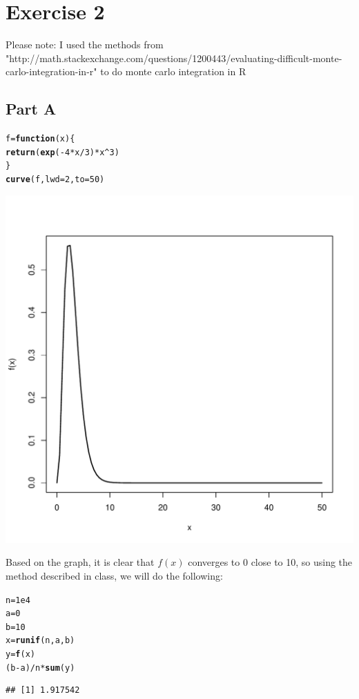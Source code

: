 \documentclass{article}\usepackage[]{graphicx}\usepackage[]{color}
\makeatletter
\newcommand{\hlnum}[1]{\textcolor[rgb]{0.686,0.059,0.569}{#1}}%
\newcommand{\hlopt}[1]{\textcolor[rgb]{0,0,0}{#1}}%
\newcommand{\hlstd}[1]{\textcolor[rgb]{0.345,0.345,0.345}{#1}}%
\newcommand{\hlkwa}[1]{\textcolor[rgb]{0.161,0.373,0.58}{\textbf{#1}}}%
\newcommand{\hlkwb}[1]{\textcolor[rgb]{0.69,0.353,0.396}{#1}}%
\newcommand{\hlkwc}[1]{\textcolor[rgb]{0.333,0.667,0.333}{#1}}%
\newcommand{\hlkwd}[1]{\textcolor[rgb]{0.737,0.353,0.396}{\textbf{#1}}}%
\newenvironment{kframe}{%
 \def\at@end@of@kframe{}%
 \ifinner\ifhmode%
  \def\at@end@of@kframe{\end{minipage}}%
  \begin{minipage}{\columnwidth}%
 \fi\fi%
 \def\FrameCommand##1{\hskip\@totalleftmargin \hskip-\fboxsep
 \colorbox{shadecolor}{##1}\hskip-\fboxsep
     \hskip-\linewidth \hskip-\@totalleftmargin \hskip\columnwidth}%
 \MakeFramed {\advance\hsize-\width
   \@totalleftmargin\z@ \linewidth\hsize
   \@setminipage}}%
 {\par\unskip\endMakeFramed%
 \at@end@of@kframe}
\newenvironment{knitrout}{}{} %
\makeatother
\begin{document}
\section*{Exercise 2}
Please note: I used the methods from "http://math.stackexchange.com/questions/1200443/evaluating-difficult-monte-carlo-integration-in-r" to do monte carlo integration in R
\subsection*{Part A}
\begin{knitrout}
\color{fgcolor}\begin{kframe}
\begin{alltt}
\hlstd{f} \hlkwb{=} \hlkwa{function}\hlstd{(}\hlkwc{x}\hlstd{)\{}
  \hlkwd{return}\hlstd{(}\hlkwd{exp}\hlstd{(}\hlopt{-}\hlnum{4}\hlopt{*}\hlstd{x}\hlopt{/}\hlnum{3}\hlstd{)}\hlopt{*}\hlstd{x}\hlopt{^}\hlnum{3}\hlstd{)}
\hlstd{\}}
\hlkwd{curve}\hlstd{(f,} \hlkwc{lwd}\hlstd{=}\hlnum{2}\hlstd{,}\hlkwc{to} \hlstd{=} \hlnum{50}\hlstd{)}
\end{alltt}
\end{kframe}
\includegraphics[width=0.60\linewidth]{figure/unnamed-chunk-3-1} 

\end{knitrout}
Based on the graph, it is clear that $f(x)$ converges to 0 close to 10, so using the method described in class, we will do the following:
\begin{knitrout}
\color{fgcolor}\begin{kframe}
\begin{alltt}
\hlstd{n} \hlkwb{=} \hlnum{1e4}
\hlstd{a} \hlkwb{=} \hlnum{0}
\hlstd{b} \hlkwb{=} \hlnum{10}
\hlstd{x} \hlkwb{=} \hlkwd{runif}\hlstd{(n, a, b)}
\hlstd{y} \hlkwb{=} \hlkwd{f}\hlstd{(x)}
\hlstd{(b}\hlopt{-}\hlstd{a)}\hlopt{/}\hlstd{n}\hlopt{*}\hlkwd{sum}\hlstd{(y)}
\end{alltt}
\begin{verbatim}
## [1] 1.917542
\end{verbatim}
\end{kframe}
\end{knitrout}
\end{document}

